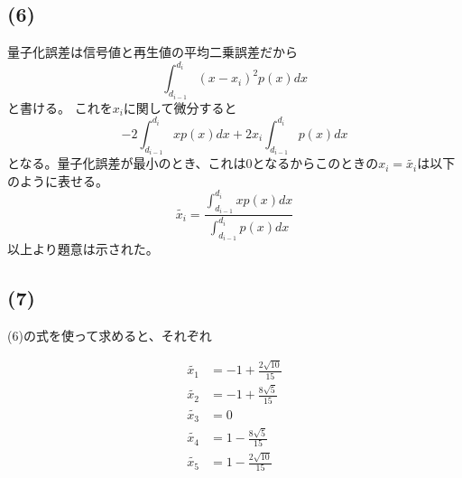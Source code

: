\documentclass[a4paper,12pt,xelatex,ja=standard]{bxjsarticle}
\begin{document}
  \subsection*{(6)}
  量子化誤差は信号値と再生値の平均二乗誤差だから
  \[
    \int^{d_i}_{d_{i-1}}(x - x_i)^2 p(x) dx
  \]
  と書ける。
  これを$x_i$に関して微分すると
  \[
    -2 \int^{d_i}_{d_{i-1}}x p(x) dx + 2 x_i \int^{d_i}_{d_{i-1}} p(x) dx
  \]
  となる。量子化誤差が最小のとき、これは0となるからこのときの$x_i=\tilde{x_i}$は以下のように表せる。
  \[
    \tilde{x_i} = \frac{\int^{d_i}_{d_{i-1}} x p(x) dx}{\int^{d_i}_{d_{i-1}} p(x) dx}
  \]
  以上より題意は示された。

  \subsection*{(7)}
  (6)の式を使って求めると、それぞれ

  \begin{equation*}
    \begin{split}
      \tilde{x_1} &= -1 + \frac{2\sqrt{10}}{15}\\
      \tilde{x_2} &= -1 + \frac{8\sqrt{5}}{15}\\
      \tilde{x_3} &= 0\\
      \tilde{x_4} &= 1 - \frac{8\sqrt{5}}{15}\\
      \tilde{x_5} &= 1 - \frac{2\sqrt{10}}{15}
    \end{split}
  \end{equation*}
\end{document}
